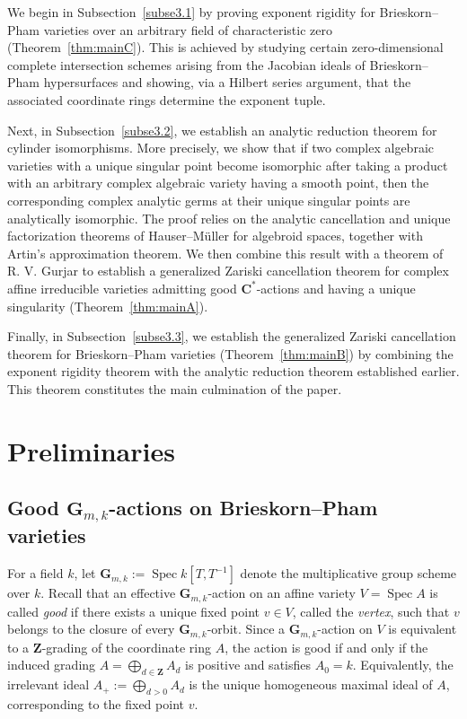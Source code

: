 \documentclass[english,10pt,reqno,twoside]{amsart}
\numberwithin{equation}{section}
\numberwithin{figure}{section}
\theoremstyle{plain}
\theoremstyle{plain}
\theoremstyle{definition}
\theoremstyle{plain}
\numberwithin{equation}{section}
\newcommand{\C}{\mathbf{C}}
\newcommand{\G}{\mathbf{G}}
\newcommand{\Z}{\mathbf{Z}}
\newcommand{\Spec}{\operatorname{Spec}}
\begin{document}
We begin in Subsection~\ref{subse3.1} by proving exponent rigidity for Brieskorn--Pham varieties over an arbitrary field of characteristic zero (Theorem~\ref{thm:mainC}). This is achieved by studying certain zero-dimensional complete intersection schemes arising from the Jacobian ideals of Brieskorn--Pham hypersurfaces and showing, via a Hilbert series argument, that the associated coordinate rings determine the exponent tuple.

Next, in Subsection~\ref{subse3.2}, we establish an analytic reduction theorem for cylinder isomorphisms. More precisely, we show that if two complex algebraic varieties with a unique singular point become isomorphic after taking a product with an arbitrary complex algebraic variety having a smooth point, then the corresponding complex analytic germs at their unique singular points are analytically isomorphic. The proof relies on the analytic cancellation and unique factorization theorems of Hauser--M\"uller for algebroid spaces, together with Artin's approximation theorem. We then combine this result with a theorem of R. V. Gurjar to establish a generalized Zariski cancellation theorem for complex affine irreducible varieties admitting good $\C^*$-actions and having a unique singularity (Theorem~\ref{thm:mainA}).

Finally, in Subsection~\ref{subse3.3}, we establish the generalized Zariski cancellation theorem for Brieskorn--Pham varieties (Theorem~\ref{thm:mainB}) by combining the exponent rigidity theorem with the analytic reduction theorem established earlier. This theorem constitutes the main culmination of the paper.


\section{\bf Preliminaries}\label{se2}

\subsection{Good $\G_{m,k}$-actions on Brieskorn--Pham varieties}\label{subse2.1}

For a field $k$, let $\G_{m,k}:=\Spec k[T,T^{-1}]$ denote the multiplicative group scheme over $k$. Recall that an effective $\G_{m,k}$-action on an affine variety $V=\Spec A$ is called \emph{good} if there exists a unique fixed point $v\in V$, called the \emph{vertex}, such that $v$ belongs to the closure of every $\G_{m,k}$-orbit. Since a $\G_{m,k}$-action on $V$ is equivalent to a $\Z$-grading of the coordinate ring $A$, the action is good if and only if the induced grading $A=\bigoplus_{d\in\Z}A_d$ is positive and satisfies $A_0=k$. Equivalently, the irrelevant ideal $A_+:=\bigoplus_{d>0}A_d$ is the unique homogeneous maximal ideal of $A$, corresponding to the fixed point $v$.
\end{document}
